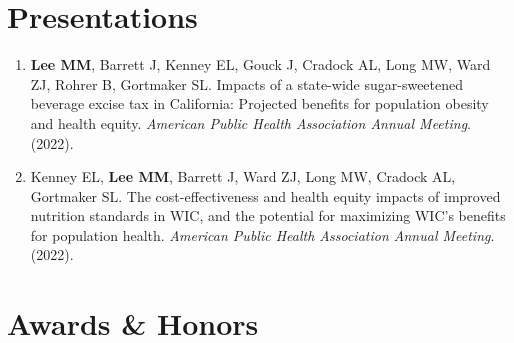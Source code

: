 \documentclass{cv_style}
\begin{document}
\section{Presentations}
\begin{enumerate}[leftmargin = 2em]
    \item \textbf{Lee MM}, Barrett J, Kenney EL, Gouck J, Cradock AL, Long MW, Ward ZJ, Rohrer B, Gortmaker SL. Impacts of a state-wide sugar-sweetened beverage excise tax in California: Projected benefits for population obesity and health equity. \textit{American Public Health Association Annual Meeting}. (2022).
    \item \parskip 1pt Kenney EL, \textbf{Lee MM}, Barrett J, Ward ZJ, Long MW, Cradock AL, Gortmaker SL. The cost-effectiveness and health equity impacts of improved nutrition standards in WIC, and the potential for maximizing WIC’s benefits for population health. \textit{American Public Health Association Annual Meeting}. (2022).
\end{enumerate}





\section{Awards \& Honors}
\end{document}
